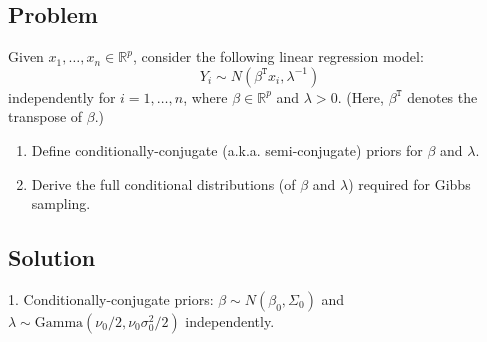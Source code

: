 \documentclass[11pt]{article}
\newcommand{\T}{\mathtt{T}}
\begin{document}
\subsection*{Problem}

Given $x_1,\ldots,x_n\in\mathds{R}^p$, consider the following linear regression model:
$$ Y_i \sim N(\beta^\T x_i,\lambda^{-1}) $$
independently for $i = 1,\ldots,n$, where $\beta\in\mathds{R}^p$ and $\lambda>0$.  (Here, $\beta^\T$ denotes the transpose of $\beta$.)
\begin{enumerate}
\item Define conditionally-conjugate (a.k.a. semi-conjugate) priors for $\beta$ and $\lambda$.
\item Derive the full conditional distributions (of $\beta$ and $\lambda$) required for Gibbs sampling.
\end{enumerate}



\subsection*{Solution}

1. Conditionally-conjugate priors: $\beta\sim N(\beta_0,\Sigma_0)$ and $\lambda\sim\mathrm{Gamma}(\nu_0/2,\nu_0\sigma_0^2/2)$ independently.
\end{document}
